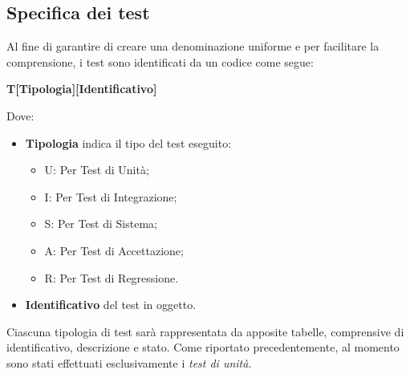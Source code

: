 \subsection{Specifica dei test}
Al fine di garantire di creare una denominazione uniforme e per facilitare la comprensione, i test sono identificati da un codice come segue:
\begin{center}
    \textbf{T[Tipologia][Identificativo]}
\end{center}
Dove:
\begin{itemize}
    \item \textbf{Tipologia} indica il tipo del test eseguito:
    \begin{itemize}
        \item U: Per Test di Unità;
        \item I: Per Test di Integrazione;
        \item S: Per Test di Sistema;
        \item A: Per Test di Accettazione;
        \item R: Per Test di Regressione.
    \end{itemize}
    \item \textbf{Identificativo} del test in oggetto.
\end{itemize}
Ciascuna tipologia di test sarà rappresentata da apposite tabelle, comprensive di identificativo, descrizione e stato. Come riportato precedentemente, al momento sono stati effettuati esclusivamente i \textit{test di unità}.

